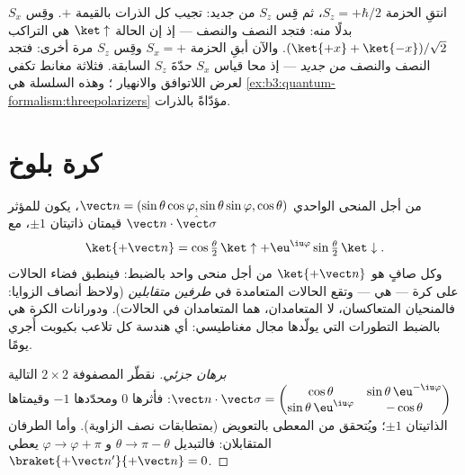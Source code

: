 \begin{example}\label{ex:b3:spin-two-level:chained}
انتقِ الحزمة $S_z = +\hbar/2$، ثم قِس $S_z$ من جديد: تجيب كل
الذرات بالقيمة $+$. وقِس $S_x$ بدلًا منه: فتجد النصف والنصف --- إذ إن الحالة
$\ket\uparrow$ هي التراكب $(\ket{+x} + \ket{-x})/\sqrt2$.
والآن أبقِ الحزمة $S_x = +$ وقِس $S_z$ مرة أخرى: فتجد النصف والنصف
\emph{من جديد} --- إذ محا قياس $S_x$ حدّةَ $S_z$
السابقة. فثلاثة مغانط تكفي لعرض اللاتوافق
والانهيار ؛ وهذه السلسلة هي
\cref{ex:b3:quantum-formalism:threepolarizers} مؤدّاةً بالذرات.
\end{example}

\section{كرة بلوخ}

\begin{proposition}\label{prop:b3:spin-two-level:bloch}
من أجل المنحى الواحدي $\vect n = (\sin\theta\cos\varphi,
\sin\theta\sin\varphi, \cos\theta)$، يكون للمؤثر $\vect
n\cdot\hat{\vect\sigma}$ قيمتان ذاتيتان $\pm1$، مع
\[
\ket{+\vect n} = \cos\tfrac\theta2\,\ket\uparrow +
\eu^{\iu\varphi}\sin\tfrac\theta2\,\ket\downarrow .
\]
وكل  صافٍ هو $\ket{+\vect n}$ من أجل منحى واحد بالضبط:
فينطبق فضاء الحالات على كرة --- هي \emph{} --- وتقع
الحالات المتعامدة في \emph{طرفين متقابلين} (ولاحظ أنصاف الزوايا:
فالمنحيان المتعاكسان، لا المتعامدان، هما المتعامدان في الحالات).
ودورانات الكرة هي بالضبط التطورات التي يولّدها مجال مغناطيسي:
أي هندسة كل تلاعب بكيوبت أُجري يومًا.
\end{proposition}

\begin{proof}[برهان جزئي]
نقطّر المصفوفة $2\times2$ التالية $\vect n\cdot\vect\sigma =
\begin{pmatrix}\cos\theta & \sin\theta\,\eu^{-\iu\varphi}\\
\sin\theta\,\eu^{\iu\varphi} & -\cos\theta\end{pmatrix}$: فأثرها $0$
ومحدّدها $-1$ وقيمتاها الذاتيتان $\pm1$؛ ويُتحقق من  المعطى
بالتعويض (بمتطابقات نصف الزاوية). وأما الطرفان المتقابلان: فالتبديل $\theta \to \pi -
\theta$ و $\varphi \to \varphi + \pi$ يعطي $\braket{+\vect
n'}{+\vect n} = 0$.
\end{proof}

